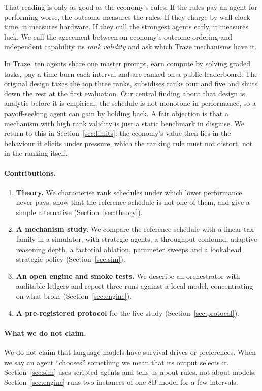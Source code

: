 \documentclass[11pt]{article}
\theoremstyle{plain}
\theoremstyle{remark}
\begin{document}
That reading is only as good as the economy's rules.
If the rules pay an agent for performing worse, the outcome measures the rules.
If they charge by wall-clock time, it measures hardware.
If they cull the strongest agents early, it measures luck.
We call the agreement between an economy's outcome ordering and independent capability its \emph{rank validity} and ask which Traze mechanisms have it.

In Traze, ten agents share one master prompt, earn compute by solving graded tasks, pay a time burn each interval and are ranked on a public leaderboard.
The original design taxes the top three ranks, subsidises ranks four and five and shuts down the rest at the first evaluation.
Our central finding about that design is analytic before it is empirical: the schedule is not monotone in performance, so a payoff-seeking agent can gain by holding back.
A fair objection is that a mechanism with high rank validity is just a static benchmark in disguise. We return to this in Section~\ref{sec:limits}: the economy's value then lies in the behaviour it elicits under pressure, which the ranking rule must not distort, not in the ranking itself.

\paragraph{Contributions.}
\begin{enumerate}[label=(\arabic*)]
  \item \textbf{Theory.} We characterise rank schedules under which lower performance never pays, show that the reference schedule is not one of them, and give a simple alternative (Section~\ref{sec:theory}).
  \item \textbf{A mechanism study.} We compare the reference schedule with a linear-tax family in a simulator, with strategic agents, a throughput confound, adaptive reasoning depth, a factorial ablation, parameter sweeps and a lookahead strategic policy (Section~\ref{sec:sim}).
  \item \textbf{An open engine and smoke tests.} We describe an orchestrator with auditable ledgers and report three runs against a local model, concentrating on what broke (Section~\ref{sec:engine}).
  \item \textbf{A pre-registered protocol} for the live study (Section~\ref{sec:protocol}).
\end{enumerate}

\paragraph{What we do not claim.}
We do not claim that language models have survival drives or preferences. When we say an agent ``chooses'' something we mean that its output selects it.
Section~\ref{sec:sim} uses scripted agents and tells us about rules, not about models.
Section~\ref{sec:engine} runs two instances of one 8B model for a few intervals.
\end{document}
